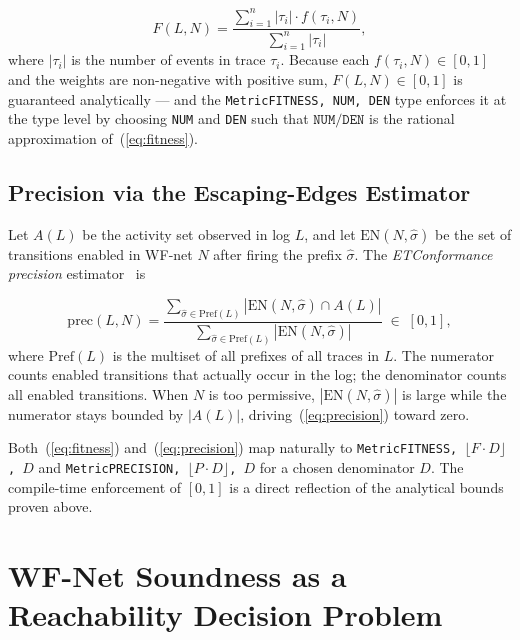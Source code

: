 \begin{equation}
  F(L, N) = \frac{\sum_{i=1}^{n} |\tau_i| \cdot f(\tau_i, N)}
                 {\sum_{i=1}^{n} |\tau_i|},
  \label{eq:fitness}
\end{equation}
where $|\tau_i|$ is the number of events in trace $\tau_i$. Because each
$f(\tau_i, N) \in [0,1]$ and the weights are non-negative with positive sum,
$F(L,N) \in [0,1]$ is guaranteed analytically --- and the
\texttt{Metric\langle FITNESS, NUM, DEN\rangle} type enforces it at the type
level by choosing \texttt{NUM} and \texttt{DEN} such that
$\mathtt{NUM}/\mathtt{DEN}$ is the rational approximation of~(\ref{eq:fitness}).

\subsection{Precision via the Escaping-Edges Estimator}

Let $A(L)$ be the activity set observed in log $L$, and let
$\mathrm{EN}(N, \hat\sigma)$ be the set of transitions enabled in WF-net $N$
after firing the prefix $\hat\sigma$. The \emph{ETConformance precision}
estimator~\cite{munozgama2010conformance} is

\begin{equation}
  \mathrm{prec}(L, N)
  = \frac{\displaystyle\sum_{\hat\sigma \in \mathrm{Pref}(L)}
          |\mathrm{EN}(N,\hat\sigma) \cap A(L)|}
         {\displaystyle\sum_{\hat\sigma \in \mathrm{Pref}(L)}
          |\mathrm{EN}(N,\hat\sigma)|}
  \;\in\; [0,1],
  \label{eq:precision}
\end{equation}
where $\mathrm{Pref}(L)$ is the multiset of all prefixes of all traces in $L$.
The numerator counts enabled transitions that actually occur in the log; the
denominator counts all enabled transitions. When $N$ is too permissive,
$|\mathrm{EN}(N,\hat\sigma)|$ is large while the numerator stays bounded by
$|A(L)|$, driving~(\ref{eq:precision}) toward zero.

Both~(\ref{eq:fitness}) and~(\ref{eq:precision}) map naturally to
\texttt{Metric\langle FITNESS, $\lfloor F \cdot D \rfloor$, $D$\rangle} and
\texttt{Metric\langle PRECISION, $\lfloor P \cdot D \rfloor$, $D$\rangle}
for a chosen denominator $D$. The compile-time enforcement of $[0,1]$ is a
direct reflection of the analytical bounds proven above.

\section{WF-Net Soundness as a Reachability Decision Problem}
\label{sec:conc-wfnet}

